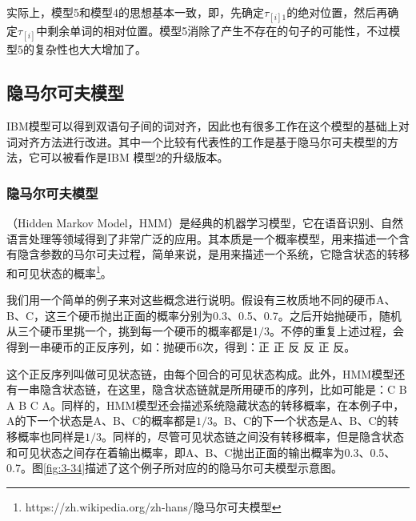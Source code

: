 \parinterval 实际上，模型5和模型4的思想基本一致，即，先确定$\tau_{[i]1}$的绝对位置，然后再确定$\tau_{[i]}$中剩余单词的相对位置。模型5消除了产生不存在的句子的可能性，不过模型5的复杂性也大大增加了。


\subsection{隐马尔可夫模型}

\parinterval IBM模型可以得到双语句子间的词对齐，因此也有很多工作在这个模型的基础上对词对齐方法进行改进。其中一个比较有代表性的工作是基于隐马尔可夫模型的方法\cite{vogel1996hmm}，它可以被看作是IBM 模型2的升级版本。


\subsubsection{隐马尔可夫模型}

（Hidden Markov Model，HMM）是经典的机器学习模型，它在语音识别、自然语言处理等领域得到了非常广泛的应用。其本质是一个概率模型，用来描述一个含有隐含参数的马尔可夫过程，简单来说，是用来描述一个系统，它隐含状态的转移和可见状态的概率\footnote{https://zh.wikipedia.org/zh-hans/隐马尔可夫模型}。

\parinterval 我们用一个简单的例子来对这些概念进行说明。假设有三枚质地不同的硬币A、B、C，这三个硬币抛出正面的概率分别为0.3、0.5、0.7。之后开始抛硬币，随机从三个硬币里挑一个，挑到每一个硬币的概率都是$1/3$。不停的重复上述过程，会得到一串硬币的正反序列，如：抛硬币6次，得到：正 正 反 反 正 反。

\parinterval 这个正反序列叫做可见状态链，由每个回合的可见状态构成。此外，HMM模型还有一串隐含状态链，在这里，隐含状态链就是所用硬币的序列，比如可能是：C B A B C A。同样的，HMM模型还会描述系统隐藏状态的转移概率，在本例子中，A的下一个状态是A、B、C的概率都是$1/3$。B、C的下一个状态是A、B、C的转移概率也同样是$1/3$。同样的，尽管可见状态链之间没有转移概率，但是隐含状态和可见状态之间存在着输出概率，即A、B、C抛出正面的输出概率为0.3、0.5、0.7。图\ref{fig:3-34}描述了这个例子所对应的的隐马尔可夫模型示意图。

